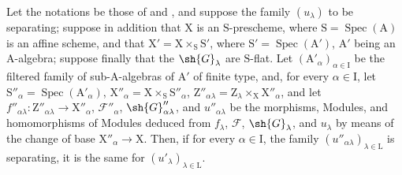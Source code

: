 \begin{lemma}[11.9.12]
\label{IV.11.9.12}
Let the notations be those of  and , and suppose the family $(u_\lambda)$ to be separating; suppose in addition that $\mathrm{X}$ is an $\mathrm{S}$-prescheme, where $\mathrm{S}=\operatorname{Spec}(\mathrm{A})$ is an affine scheme, and that $\mathrm{X}'=\mathrm{X}\times_\mathrm{S}\mathrm{S}'$, where $\mathrm{S}'=\operatorname{Spec}(\mathrm{A}')$, $\mathrm{A}'$ being an $\mathrm{A}$-algebra; suppose finally that the $\sh{G}_\lambda$ are $\mathrm{S}$-flat.
Let $(\mathrm{A}'_\alpha)_{\alpha\in\mathrm{I}}$ be the filtered family of sub-$\mathrm{A}$-algebras of $\mathrm{A}'$ of finite type, and, for every $\alpha\in\mathrm{I}$, let $\mathrm{S}''_\alpha=\operatorname{Spec}(\mathrm{A}'_\alpha)$, $\mathrm{X}''_\alpha=\mathrm{X}\times_\mathrm{S}\mathrm{S}''_\alpha$, $\mathrm{Z}''_{\alpha\lambda}=\mathrm{Z}_\lambda\times_\mathrm{X}\mathrm{X}''_\alpha$, and let $f''_{\alpha\lambda}:\mathrm{Z}''_{\alpha\lambda}\to\mathrm{X}''_\alpha$, $\mathscr{F}''_\alpha$, $\sh{G}''_{\alpha\lambda}$, and $u''_{\alpha\lambda}$ be the morphisms, Modules, and homomorphisms of Modules deduced from $f_\lambda$, $\mathscr{F}$, $\sh{G}_\lambda$, and $u_\lambda$ by means of the change of base $\mathrm{X}''_\alpha\to\mathrm{X}$.
Then, if for every $\alpha\in\mathrm{I}$, the family $(u''_{\alpha\lambda})_{\lambda\in\mathrm{L}}$ is separating, it is the same for $(u'_\lambda)_{\lambda\in\mathrm{L}}$.
\end{lemma}


